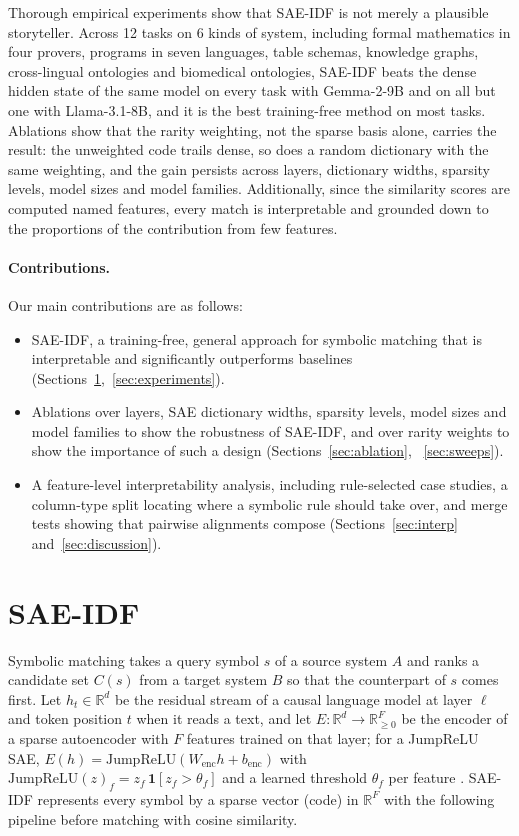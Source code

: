 \documentclass[11pt]{article}
\newcommand{\method}{SAE\mbox{-}IDF\xspace}
\newcommand{\R}{\mathbb{R}}
\begin{document}
Thorough empirical experiments show that \method is not merely a plausible storyteller. Across 12 tasks on 6 kinds of system, including formal mathematics in four provers, programs in seven languages, table schemas, knowledge graphs, cross-lingual ontologies and biomedical ontologies, \method beats the dense hidden state of the same model on every task with Gemma-2-9B and on all but one with Llama-3.1-8B, and it is the best training-free method on most tasks.
Ablations show that the rarity weighting, not the sparse basis alone, carries the result: the unweighted code trails dense, so does a random dictionary with the same weighting, and the gain persists across layers, dictionary widths, sparsity levels, model sizes and model families.
Additionally, since the similarity scores are computed named features, every match is interpretable and grounded down to the proportions of the contribution from few features. 

\paragraph{Contributions.} Our main contributions are as follows:

\begin{itemize}[leftmargin=*, nosep, topsep=1pt]
  \item \method, a training-free, general approach for symbolic matching that is interpretable and significantly outperforms baselines (Sections~\ref{sec:method},~\ref{sec:experiments}).
  \item Ablations over layers, SAE dictionary widths, sparsity levels, model sizes and model families to show the robustness of \method, and over rarity weights to show the importance of such a design (Sections~\ref{sec:ablation}, ~\ref{sec:sweeps}).
  \item A feature-level interpretability analysis, including rule-selected case studies, a column-type split locating where a symbolic rule should take over, and merge tests showing that pairwise alignments compose (Sections~\ref{sec:interp} and~\ref{sec:discussion}).
\end{itemize}

\section{\method}
\label{sec:method}

Symbolic matching takes a query symbol $s$ of a source system $A$ and ranks a candidate set $C(s)$ from a target system $B$ so that the counterpart of $s$ comes first.
Let $h_t\in\R^d$ be the residual stream of a causal language model at layer $\ell$ and token position $t$ when it reads a text, and let $E:\R^d\to\R^F_{\ge 0}$ be the encoder of a sparse autoencoder with $F$ features trained on that layer; for a JumpReLU SAE, $E(h)=\mathrm{JumpReLU}(W_{\mathrm{enc}}h+b_{\mathrm{enc}})$ with $\mathrm{JumpReLU}(z)_f=z_f\,\mathbf{1}[z_f>\theta_f]$ and a learned threshold $\theta_f$ per feature \citep{rajamanoharan2024jumping}.
\method represents every symbol by a sparse vector (code) in $\R^F$ with the following pipeline before matching with cosine similarity.
\end{document}

